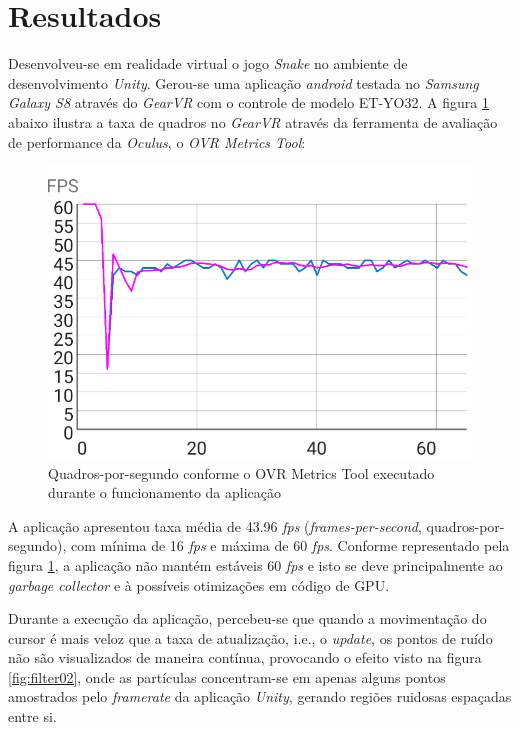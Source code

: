 \documentclass{vgtc}                          %
\begin{document}
\section{Resultados} \label{sec:results}

Desenvolveu-se em realidade virtual o jogo \textit{Snake} no ambiente de desenvolvimento \textit{Unity}. Gerou-se uma aplicação \textit{android} testada no \textit{Samsung Galaxy S8} através do \textit{GearVR} com o controle de modelo ET-YO32. A figura \ref{fig:VRPerformanceChart} abaixo ilustra a taxa de quadros no \textit{GearVR} através da ferramenta de avaliação de performance da \textit{Oculus}, o \textit{OVR Metrics Tool}:

\begin{figure}[h!] 
\centering
\includegraphics[width=\linewidth]{VRPerformance}
\caption{Quadros-por-segundo conforme o OVR Metrics Tool executado durante o funcionamento da aplicação }
\label{fig:VRPerformanceChart}
\end{figure}

A aplicação apresentou taxa média de 43.96 \textit{fps} (\textit{frames-per-second}, quadros-por-segundo), com mínima de 16 \textit{fps} e máxima de 60 \textit{fps}. Conforme representado pela figura \ref{fig:VRPerformanceChart}, a aplicação não mantém estáveis 60 \textit{fps} e isto se deve principalmente ao \textit{garbage collector} e à possíveis otimizações em código de GPU.

Durante a execução da aplicação, percebeu-se que quando a movimentação do cursor é mais veloz que a taxa de atualização, i.e., o \textit{update}, os pontos de ruído não são visualizados de maneira contínua, provocando o efeito visto na figura \ref{fig:filter02}, onde as partículas concentram-se em apenas alguns pontos amostrados pelo \textit{framerate} da aplicação \textit{Unity}, gerando regiões ruidosas espaçadas entre si.
\end{document}

